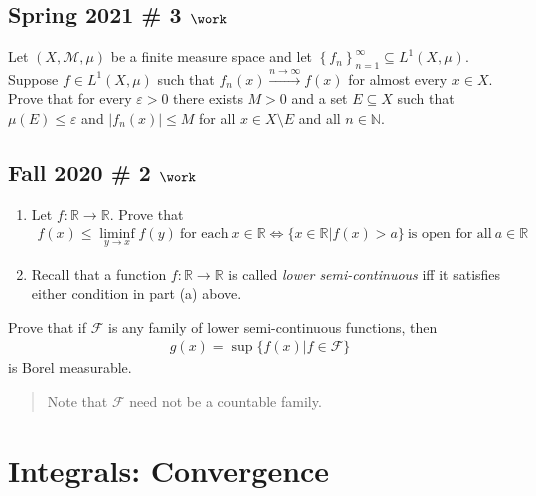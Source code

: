 \hypertarget{spring-2021-3-work}{%
\subsection{\texorpdfstring{Spring 2021 \# 3
\(\work\)}{Spring 2021 \# 3 \textbackslash work}}\label{spring-2021-3-work}}

Let \((X, \mathcal{M}, \mu)\) be a finite measure space and let
\(\left\{{ f_n}\right\}_{n=1}^{\infty } \subseteq L^1(X, \mu)\). Suppose
\(f\in L^1(X, \mu)\) such that \(f_n(x) \overset{n\to \infty }\to f(x)\)
for almost every \(x \in X\). Prove that for every \({\varepsilon}> 0\)
there exists \(M>0\) and a set \(E\subseteq X\) such that
\(\mu(E) \leq {\varepsilon}\) and
\({\left\lvert {f_n(x)} \right\rvert}\leq M\) for all
\(x\in X\setminus E\) and all \(n\in {\mathbb{N}}\).

\hypertarget{fall-2020-2-work}{%
\subsection{\texorpdfstring{Fall 2020 \# 2
\(\work\)}{Fall 2020 \# 2 \textbackslash work}}\label{fall-2020-2-work}}

\begin{enumerate}
\def\labelenumi{\alph{enumi}.}
\item
  Let \(f: {\mathbb{R}}\to {\mathbb{R}}\). Prove that
  \begin{align*}
  f(x) \leq \liminf_{y\to x} f(y)~ \text{for each}~ x\in {{\mathbb{R}}} \iff \{ x\in {{\mathbb{R}}} \mathrel{\Big|}f(x) > a \}~\text{is open for all}~ a\in {{\mathbb{R}}}
  \end{align*}
\item
  Recall that a function \(f: {{\mathbb{R}}} \to {{\mathbb{R}}}\) is
  called \emph{lower semi-continuous} iff it satisfies either condition
  in part (a) above.
\end{enumerate}

Prove that if \(\mathcal{F}\) is any family of lower semi-continuous
functions, then
\begin{align*}
g(x) = \sup\{ f(x) \mathrel{\Big|}f\in \mathcal{F}\}
\end{align*}
is Borel measurable.

\begin{quote}
Note that \(\mathcal{F}\) need not be a countable family.
\end{quote}

\hypertarget{integrals-convergence}{%
\section{Integrals: Convergence}\label{integrals-convergence}}

